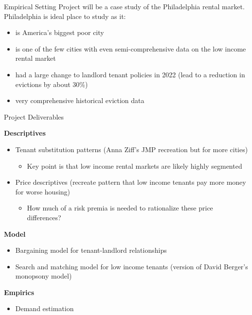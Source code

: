 \documentclass[10pt, xcolor=dvipsnames]{beamer}
\begin{document}
    

\begin{frame}{Empirical Setting}
    Project will be a case study of the Philadelphia rental market.\\

    Philadelphia is ideal place to study as it:

    \begin{itemize}
        \item is America's biggest poor city
        \item is one of the few cities with even semi-comprehensive data on the low income rental market
        \item had a large change to landlord tenant policies in 2022 (lead to a reduction in evictions by about 30\%)
        \item very comprehensive historical eviction data
    \end{itemize}
    
\end{frame}


\begin{frame}{Project Deliverables}

\textbf{Descriptives}\\
    \begin{itemize}
        \item Tenant substitution patterns (Anna Ziff's JMP recreation but for more cities)
        \begin{itemize}
            \item Key point is that low income rental markets are likely highly segmented
        \end{itemize}
        \item Price descriptives (recreate pattern that low income tenants pay more money for worse housing)
        \begin{itemize}
            \item How much of a risk premia is needed to rationalize these price differences?
        \end{itemize}
    \end{itemize}

\textbf{Model}\\
\begin{itemize}
    \item Bargaining model for tenant-landlord relationships
    \item Search and matching model for low income tenants (version of David Berger's monopsony model)
\end{itemize}
\textbf{Empirics}\\
\begin{itemize}
    \item Demand estimation
\end{itemize}

\end{frame}
\end{document}
